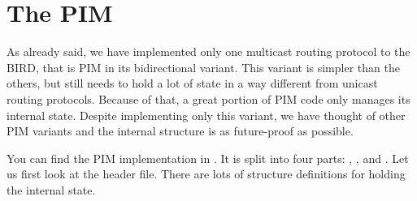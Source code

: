 \section{The PIM}

As already said, we have implemented only one multicast routing protocol to the
BIRD, that is PIM in its bidirectional variant. This variant is simpler than
the others, but still needs to hold a lot of state in a way different from
unicast routing protocols. Because of that, a great portion of PIM code only
manages its internal state. Despite implementing only this variant, we have
thought of other PIM variants and the internal structure is as
future-proof as possible.

You can find the PIM implementation in . It is split into four
parts: , ,  and . Let us first
look at the header file. There are lots of structure definitions for holding
the internal state.

